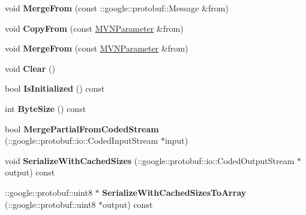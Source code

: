 \begin{DoxyCompactItemize}
void {\bfseries Merge\+From} (const \+::google\+::protobuf\+::\+Message \&from)
\item 
\mbox{\label{classcaffe_1_1_m_v_n_parameter_a94264d035baad4d897f271d370fd49c5}} 
void {\bfseries Copy\+From} (const \mbox{\hyperlink{classcaffe_1_1_m_v_n_parameter}{M\+V\+N\+Parameter}} \&from)
\item 
\mbox{\label{classcaffe_1_1_m_v_n_parameter_a34f5c9a8268ef757f5627df24ec8604b}} 
void {\bfseries Merge\+From} (const \mbox{\hyperlink{classcaffe_1_1_m_v_n_parameter}{M\+V\+N\+Parameter}} \&from)
\item 
\mbox{\label{classcaffe_1_1_m_v_n_parameter_af7886746c0645591bd7de14f47702d83}} 
void {\bfseries Clear} ()
\item 
\mbox{\label{classcaffe_1_1_m_v_n_parameter_adf0d700b3512ae01265b6abd88c912f8}} 
bool {\bfseries Is\+Initialized} () const
\item 
\mbox{\label{classcaffe_1_1_m_v_n_parameter_aa7c16f9a1999818f0f91c54a56971558}} 
int {\bfseries Byte\+Size} () const
\item 
\mbox{\label{classcaffe_1_1_m_v_n_parameter_a88ee4806a8b7a2878ede4550cef48a43}} 
bool {\bfseries Merge\+Partial\+From\+Coded\+Stream} (\+::google\+::protobuf\+::io\+::\+Coded\+Input\+Stream $\ast$input)
\item 
\mbox{\label{classcaffe_1_1_m_v_n_parameter_abc546802ce860ad43fff628a3ae7aabc}} 
void {\bfseries Serialize\+With\+Cached\+Sizes} (\+::google\+::protobuf\+::io\+::\+Coded\+Output\+Stream $\ast$output) const
\item 
\mbox{\label{classcaffe_1_1_m_v_n_parameter_a688da874e1a53d2cb6d8448e3ba73a18}} 
\+::google\+::protobuf\+::uint8 $\ast$ {\bfseries Serialize\+With\+Cached\+Sizes\+To\+Array} (\+::google\+::protobuf\+::uint8 $\ast$output) const
\item 
\mbox{\label{classcaffe_1_1_m_v_n_parameter_a8aa1fc24f38dc97259b53359864e4c68}} 

\end{DoxyCompactItemize}
